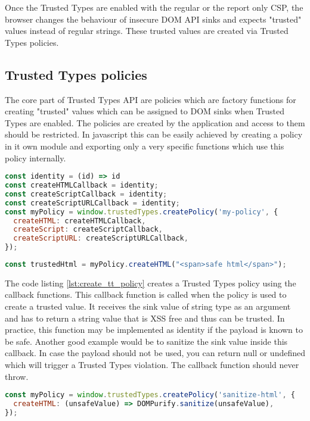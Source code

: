 Once the Trusted Types are enabled with the regular or the report only CSP, the browser changes the
behaviour of insecure DOM API sinks and expects "trusted" values instead of regular strings. These
trusted values are created via Trusted Types policies.

\subsection{Trusted Types policies}
\label{subsec:tt_policy}

The core part of Trusted Types API are policies which are factory functions for creating "trusted"
values which can be assigned to DOM sinks when Trusted Types are enabled. The policies are created
by the application and access to them should be restricted. In javascript this can be easily
achieved by creating a policy in it own module and exporting only a very specific functions which
use this policy internally.

\bigskip
\begin{lstlisting}[language=JavaScript, caption=Creating Trusted Types policy, label={lst:create_tt_policy}]
const identity = (id) => id
const createHTMLCallback = identity;
const createScriptCallback = identity;
const createScriptURLCallback = identity;
const myPolicy = window.trustedTypes.createPolicy('my-policy', {
  createHTML: createHTMLCallback,
  createScript: createScriptCallback,
  createScriptURL: createScriptURLCallback,
});
\end{lstlisting}

\bigskip
\begin{lstlisting}[language=JavaScript, caption=Create trusted value using a policy]
const trustedHtml = myPolicy.createHTML("<span>safe html</span>");
\end{lstlisting}

The code listing \ref{lst:create_tt_policy} creates a Trusted Types policy using the callback
functions. This callback function is called when the policy is used to create a trusted value. It
receives the sink value of string type as an argument and has to return a string value that is XSS
free and thus can be trusted. In practice, this function may be implemented as identity if the
payload is known to be safe. Another good example would be to sanitize the sink value inside this
callback. In case the payload should not be used, you can return null or undefined which will
trigger a Trusted Types violation. The callback function should never throw.

\bigskip
\begin{lstlisting}[language=JavaScript, caption=Using a policy to sanitize HTML values]
const myPolicy = window.trustedTypes.createPolicy('sanitize-html', {
  createHTML: (unsafeValue) => DOMPurify.sanitize(unsafeValue),
});
\end{lstlisting}

